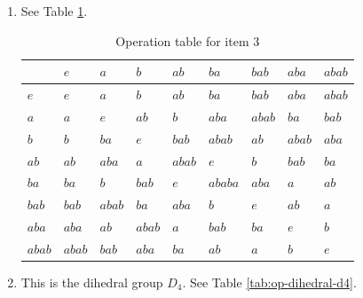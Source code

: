 \documentclass{article}
\begin{document}
\begin{enumerate}
    \item See Table \ref{tab:op-exercise-5G3}.
        \begin{table}[]
            \centering
            \begin{tabular}{l|llllllll}
                & $e$   & $a$   & $b$   & $ab$  & $ba$   & $bab$ & $aba$ & $abab$\\ \hline
            $e$   & $e$   & $a$   & $b$   & $ab$  & $ba$   & $bab$ & $aba$ & $abab$\\
            $a$   & $a$   & $e$   & $ab$  & $b$   & $aba$  & $abab$& $ba$  & $bab$ \\
            $b$   & $b$   & $ba$  & $e$   & $bab$ & $abab$ & $ab$  & $abab$& $aba$ \\
            $ab$  & $ab$  & $aba$ & $a$   & $abab$& $e$    & $b$   & $bab$ & $ba$  \\
            $ba$  & $ba$  & $b$   & $bab$ & $e$   & $ababa$ & $aba$ & $a$   & $ab$  \\
            $bab$ & $bab$ & $abab$& $ba$  & $aba$ & $b$    & $e$   & $ab$  & $a$   \\
            $aba$ & $aba$ & $ab$  & $abab$& $a$   & $bab$  & $ba$  & $e$   & $b$   \\
            $abab$& $abab$& $bab$ & $aba$ & $ba$  & $ab$   & $a$   & $b$   & $e$  
            \end{tabular}
            \caption{Operation table for item 3}
            \label{tab:op-exercise-5G3}
        \end{table}    

    \item This is the dihedral group $D_4$. See Table \ref{tab:op-dihedral-d4}.


\end{enumerate}
\end{document}
